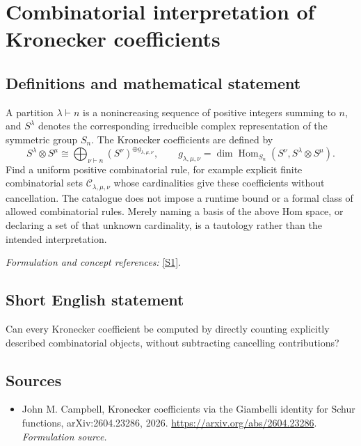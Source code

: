 \documentclass[11pt]{article}
\begin{document}
\section*{\texorpdfstring{Combinatorial interpretation of Kronecker coefficients}{Combinatorial interpretation of Kronecker coefficients}}\label{3200011}
\subsection{Definitions and mathematical statement}
A partition $\lambda\vdash n$ is a nonincreasing sequence of positive integers summing to $n$, and $S^\lambda$ denotes the corresponding irreducible complex representation of the symmetric group $S_n$. The Kronecker coefficients are defined by
\[
 S^\lambda\otimes S^\mu\cong
 \bigoplus_{\nu\vdash n}(S^\nu)^{\oplus g_{\lambda,\mu,\nu}},
 \qquad
 g_{\lambda,\mu,\nu}=\dim\operatorname{Hom}_{S_n}
 (S^\nu,S^\lambda\otimes S^\mu).
\]
Find a uniform positive combinatorial rule, for example explicit finite combinatorial sets $\mathcal C_{\lambda,\mu,\nu}$ whose cardinalities give these coefficients without cancellation. The catalogue does not impose a runtime bound or a formal class of allowed combinatorial rules. Merely naming a basis of the above Hom space, or declaring a set of that unknown cardinality, is a tautology rather than the intended interpretation.
\par\smallskip\textit{Formulation and concept references:} \href{https://arxiv.org/abs/2604.23286}{[S1]}.

\subsection{Short English statement}
Can every Kronecker coefficient be computed by directly counting explicitly described combinatorial objects, without subtracting cancelling contributions?
\subsection{Sources}
\begin{itemize}
\item[S1]John M. Campbell, Kronecker coefficients via the Giambelli identity for Schur functions, arXiv:2604.23286, 2026.
\url{https://arxiv.org/abs/2604.23286}.
\textit{Formulation source.}
\end{itemize}
\end{document}
